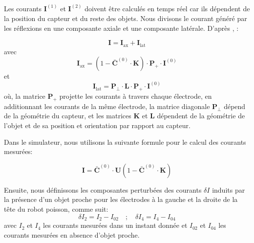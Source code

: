 Les courants $\mathbf{I}^{(1)}$ et $\mathbf{I}^{(2)}$ doivent être calculés en temps réel car ils dépendent de la position du capteur et du reste des objets. Nous divisons le courant généré par les réflexions en une composante axiale et une composante latérale. D'après \cite{Boyer2012}, : 

\begin{equation}
    \mathbf{I} = \mathbf{I}_{\text{ax}} + \mathbf{I}_{\text{lat}}
\end{equation}
avec
\begin{equation}
    \mathbf{I}_{\text{ax}} = \left ( 1- \bar{\mathbf{C}}^{(0)} \cdot \mathbf{K} \right ) \cdot \mathbf{P}_{+} \cdot \mathbf{I}^{(0)}
\end{equation}
et 
\begin{equation}
    \mathbf{I}_{\text{lat}} = \mathbf{P}_{\perp} \cdot \mathbf{L} \cdot \mathbf{P}_{+} \cdot \mathbf{I}^{(0)}
\end{equation}
où, la matrice $\mathbf{P}_{+}$ projette les courants à travers chaque électrode, en additionnant les courants de la même électrode, la matrice diagonale $\mathbf{P}_{\perp}$ dépend de la géométrie du capteur, et les matrices $\mathbf{K}$ et $\mathbf{L}$ dépendent de la géométrie de l'objet et de sa position et orientation par rapport au capteur. 

Dans le simulateur, nous utilisons la suivante formule pour le calcul des courants mesurées:

\begin{equation}
    \mathbf{I}= \bar{\mathbf{C}}^{(0)} \cdot \mathbf{U} \left ( 1- \bar{\mathbf{C}}^{(0)} \cdot \mathbf{K} \right )
\end{equation}

Ensuite, nous définissons les composantes perturbées des courants $\delta I$ induits par la présence d'un objet proche pour les électrodes à la gauche et la droite de la tête du robot poisson, comme suit: 
\begin{equation}
    \delta I_2 = I_2 - I_{02} \quad ; \quad \delta I_4 = I_4 - I_{04}
\end{equation}
avec $I_2$ et $I_4$ les courants mesurées dans un instant donnée et $I_{02}$ et $I_{04}$ les courants mesurées en absence d'objet proche. 

